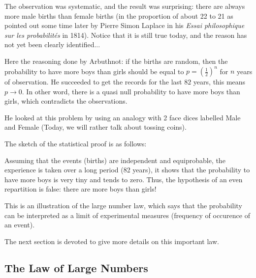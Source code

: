The observation was systematic, and the result was surprising: there are always more male births than female births
(in the proportion of about 22 to 21 as pointed out some time later by Pierre Simon Laplace in his 
\textit{Essai philosophique sur les probabilités} in 1814). 
Notice that it is still true today, and the reason has not yet been clearly identified...

Here the reasoning done by Arbuthnot:
if the births are random, then the probability to have more boys than girls should be equal to 
$p=(\frac{1}{2})^{n}$ for $n$ years of observation.
He succeeded to get the records for the last $82$ years, this means $p \rightarrow 0$.
In other word, there is a quasi null probability to have more boys than girls, which contradicts the observations. 

He looked at this problem by using an analogy with 2 face dices labelled Male and Female
(Today, we will rather talk about tossing coins). 
\medskip

The sketch of the statistical proof is as follows:

Assuming that the events (births) are independent and equiprobable,
the experience is taken over a long period (82 years), it shows that the probability to have more boys is very tiny and
tends to zero. 
Thus, the hypothesis of an even repartition is false: there are more boys than girls!
\medskip

This is an illustration of the large number law, which says that the probability can be interpreted 
as a limit of experimental measures (frequency of occurence of an event). 
\bigskip

\noindent {}
\bigskip

The next section is devoted to give more details on this important law.


\subsection{The Law of Large Numbers} 

